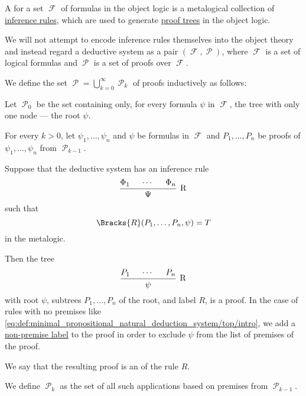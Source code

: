 \begin{definition}\label{def:deductive_system}\mimprovised
  A  for a set \( \mscrF \) of formulas in the object logic is a metalogical collection of \hyperref[def:judgment/inference_rule]{inference rules}, which are used to generate \hyperref[def:proof_tree]{proof trees} in the object logic.

  We will not attempt to encode inference rules themselves into the object theory and instead regard a deductive system as a pair \( (\mscrF, \mscrP) \), where \( \mscrF \) is a set of logical formulas and \( \mscrP \) is a set of proofs over \( \mscrF \).

  We define the set \( \mscrP = \bigcup_{k=0}^\infty \mscrP_k \) of proofs inductively as follows:
  \begin{thmenum}
     Let \( \mscrP_0 \) be the set containing only, for every formula \( \psi \) in \( \mscrF \), the tree with only one node --- the root \( \psi \).

     For every \( k > 0 \), let \( \psi_1, \ldots, \psi_n \) and \( \psi \) be formulas in \( \mscrF \) and \( P_1, \ldots, P_n \) be proofs of \( \psi_1, \ldots, \psi_n \) from \( \mscrP_{k-1} \).

    Suppose that the deductive system has an inference rule
    \begin{equation*}
      \begin{prooftree}
        \hypo{ \Phi_1 }
        \hypo{ \cdots }
        \hypo{ \Phi_n }
        \infer3[R]{ \Psi }
      \end{prooftree}
    \end{equation*}
    such that
    \begin{equation*}
      \Bracks{R}(P_1, \ldots, P_n, \psi) = T
    \end{equation*}
    in the metalogic.

    Then the tree
    \begin{equation*}
      \begin{prooftree}
        \hypo{ P_1 }
        \hypo{ \cdots }
        \hypo{ P_n }
        \infer3[R]{ \psi }
      \end{prooftree}
    \end{equation*}
    with root \( \psi \), subtrees \( P_1, \ldots, P_n \) of the root, and label \( R \), is a proof. In the case of rules with no premises like \eqref{eq:def:minimal_propositional_natural_deduction_system/top/intro}, we add a \hyperref[def:proof_tree/premises]{non-premise label} to the proof in order to exclude \( \psi \) from the list of premises of the proof.

    We say that the resulting proof is an  of the rule \( R \).

    We define \( \mscrP_k \) as the set of all such applications based on premises from \( \mscrP_{k-1} \).
  \end{thmenum}
\end{definition}

